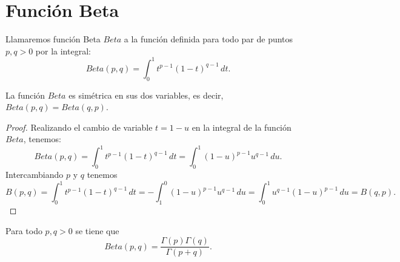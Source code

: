 \section{Función Beta}
Llamaremos función Beta $Beta$ a la función definida para
todo par de puntos $p,q>0$ por la integral:
\[
Beta(p,q)=\int_{0}^{1}t^{p-1}(1-t)^{q-1}\,dt.    
\]

\begin{theorem}
    La función $Beta$ es simétrica en sus dos variables, es decir,
    $Beta(p,q)=Beta(q,p)$.
\end{theorem}

\begin{proof}
    Realizando el cambio de variable $t = 1-u$ en la integral
    de la función $Beta$, tenemos:
    \[
        Beta(p,q)=\int_{0}^{1}t^{p-1}(1-t)^{q-1}\,dt=
        \int_{0}^{1}(1-u)^{p-1}u^{q-1}\,du.
    \]
    Intercambiando $p$ y $q$ tenemos
    \[
        B(p,q)=\int_{0}^{1}t^{p-1}(1-t)^{q-1}\,dt=
        -\int_{1}^{0}(1-u)^{p-1}u^{q-1}\,du=
        \int_{0}^{1}u^{q-1}(1-u)^{p-1}\,du=B(q,p).
    \]
\end{proof}

\begin{theorem}
    Para todo $p,q>0$ se tiene que
    \[
        Beta(p,q)=\frac{\Gamma(p)\Gamma(q)}{\Gamma(p+q)}.
    \]
\end{theorem}

